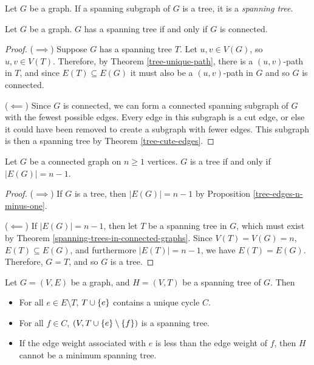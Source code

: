 \begin{defn}
    Let $G$ be a graph. If a spanning subgraph of $G$ is a tree, it is a \emph{spanning tree}.
\end{defn}

\begin{thm}\label{spanning-trees-in-connected-graphs}
    Let $G$ be a graph. $G$ has a spanning tree if and only if $G$ is connected.
\end{thm}

\begin{proof}\proofbreak
    ($\implies$) Suppose $G$ has a spanning tree $T$. Let $u, v \in V(G)$, so $u, v \in V(T)$. Therefore, by Theorem \ref{tree-unique-path}, there is a $(u,v)$-path in $T$, and since $E(T) \subseteq E(G)$ it must also be a $(u,v)$-path in $G$ and so $G$ is connected.

    ($\impliedby$) Since $G$ is connected, we can form a connected spanning subgraph of $G$ with the fewest possible edges. Every edge in this subgraph is a cut edge, or else it could have been removed to create a subgraph with fewer edges. This subgraph is then a spanning tree by Theorem \ref{tree-cute-edges}.
\end{proof}

\begin{thm}\label{tree-edges-iff}
    Let $G$ be a connected graph on $n \geq 1$ vertices. $G$ is a tree if and only if $|E(G)| = n-1$.
\end{thm}

\begin{proof}\proofbreak
    ($\implies$) If $G$ is a tree, then $|E(G)| = n-1$ by Proposition \ref{tree-edges-n-minus-one}.

    ($\impliedby$) If $|E(G)| = n-1$, then let $T$ be a spanning tree in $G$, which must exist by Theorem \ref{spanning-trees-in-connected-graphs}. Since $V(T) = V(G) = n$, $E(T) \subseteq E(G)$, and furthermore $|E(T)| = n-1$, we have $E(T) = E(G)$. Therefore, $G = T$, and so $G$ is a tree.
\end{proof}

\begin{prop}
    Let $G = (V, E)$ be a graph, and $H = (V, T)$ be a spanning tree of $G$. Then
    \begin{itemize}
        \item For all $e \in E \setminus T$, $T \cup \{e\}$ contains a unique cycle $C$.
        \item For all $f \in C$, $(V, T \cup \{e\} \setminus \{f\})$ is a spanning tree.
        \item If the edge weight associated with $e$ is less than the edge weight of $f$, then $H$ cannot be a minimum spanning tree.
    \end{itemize}
\end{prop}

